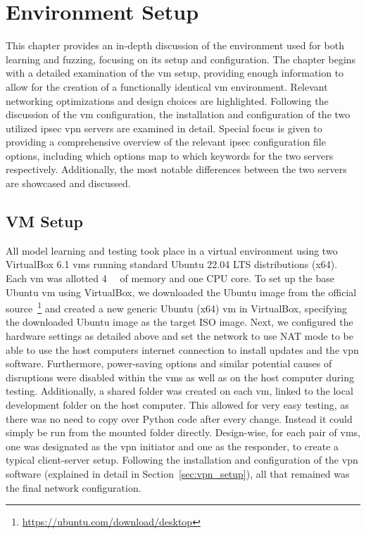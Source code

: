 %
%
% 
% 
% 

\chapter{Environment Setup} \label{chap:Setup}

This chapter provides an in-depth discussion of the environment used for both learning and fuzzing, focusing on its setup and configuration. The chapter begins with a detailed examination of the \ac{vm} setup, providing enough information to allow for the creation of a functionally identical \ac{vm} environment. Relevant networking optimizations and design choices are highlighted. Following the discussion of the \ac{vm} configuration, the installation and configuration of the two utilized \ac{ipsec} \ac{vpn} servers are examined in detail. Special focus is given to providing a comprehensive overview of the relevant \ac{ipsec} configuration file options, including which options map to which keywords for the two servers respectively. Additionally, the most notable differences between the two servers are showcased and discussed.

\section{VM Setup} \label{sec:vm_setup}
All model learning and testing took place in a virtual environment using two VirtualBox 6.1 \acp{vm} running standard Ubuntu 22.04 LTS distributions (x64). Each \ac{vm} was allotted \SI{4}{\giga\byte} of memory and one CPU core. To set up the base Ubuntu \ac{vm} using VirtualBox, we downloaded the Ubuntu image from the official source~\footnote{\url{https://ubuntu.com/download/desktop}} and created a new generic Ubuntu (x64) \ac{vm} in VirtualBox, specifying the downloaded Ubuntu image as the target ISO image. Next, we configured the hardware settings as detailed above and set the network to use NAT mode to be able to use the host computers internet connection to install updates and the \ac{vpn} software. Furthermore, power-saving options and similar potential causes of disruptions were disabled within the \acp{vm} as well as on the host computer during testing.
Additionally, a shared folder was created on each \ac{vm}, linked to the local development folder on the host computer. This allowed for very easy testing, as there was no need to copy over Python code after every change. Instead it could simply be run from the mounted folder directly. Design-wise, for each pair of \acp{vm}, one was designated as the \ac{vpn} initiator and one as the responder, to create a typical client-server setup. Following the installation and configuration of the \ac{vpn} software (explained in detail in Section~\ref{sec:vpn_setup}), all that remained was the final network configuration. 


